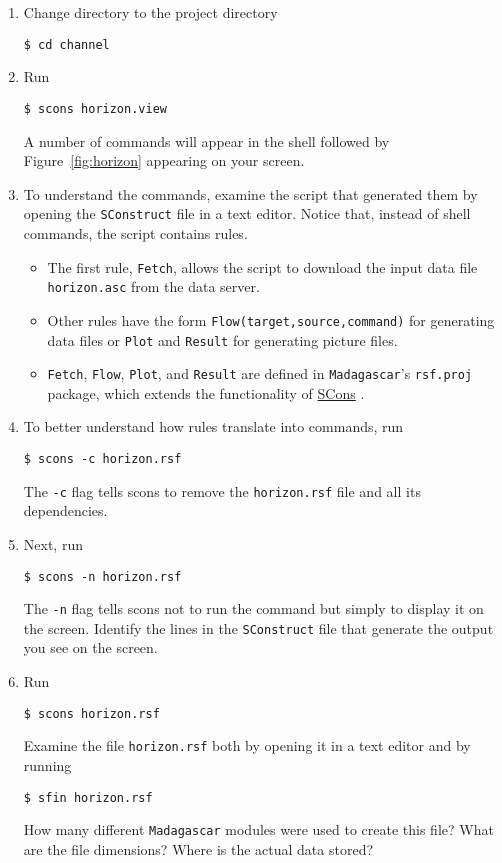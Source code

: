 \begin{enumerate}
\item Change directory to the project directory
\begin{verbatim}
$ cd channel
\end{verbatim}
\item Run
\begin{verbatim}
$ scons horizon.view
\end{verbatim}
A number of commands will appear in the shell followed by Figure~\ref{fig:horizon} appearing on your screen. 
\item To understand the commands, examine the script that generated them by opening the \texttt{SConstruct} file in a text editor. Notice that, instead of shell commands, the script contains rules. 
\begin{itemize}
\item The first rule, \texttt{Fetch}, allows the script to download the input data file \texttt{horizon.asc} from the data server. 
\item Other rules have the form \texttt{Flow(target,source,command)} for generating data files or \texttt{Plot} and  \texttt{Result} for 
generating picture files. 
\item \texttt{Fetch}, \texttt{Flow}, \texttt{Plot}, and \texttt{Result} are defined in \texttt{Madagascar}'s \texttt{rsf.proj} package, which extends the functionality of \href{http://www.scons.org}{SCons}
\cite[]{icassp}.
\end{itemize}
\item To better understand how rules translate into commands, run 
\begin{verbatim}
$ scons -c horizon.rsf
\end{verbatim}
The \texttt{-c} flag tells scons to remove the \texttt{horizon.rsf} file and all its dependencies.
\item Next, run
\begin{verbatim}
$ scons -n horizon.rsf
\end{verbatim}
The \texttt{-n} flag tells scons not to run the command but simply to display it on the screen. Identify the lines in the \texttt{SConstruct} file that generate the output you see on the screen.
\item Run
\begin{verbatim}
$ scons horizon.rsf
\end{verbatim}
Examine the file \texttt{horizon.rsf} both by opening it in a text editor and by running
\begin{verbatim}
$ sfin horizon.rsf
\end{verbatim}
How many different \texttt{Madagascar} modules were used to create this file? What are the file dimensions? Where is the actual data stored?


\end{enumerate}
